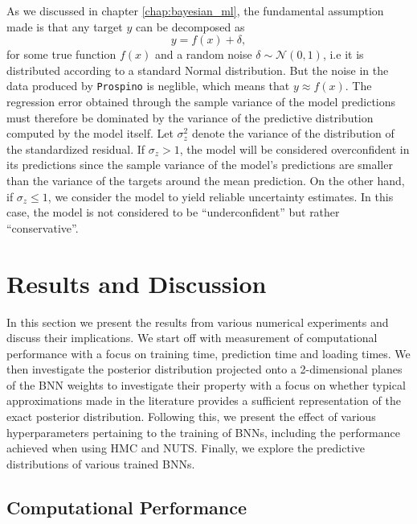 As we discussed in chapter \ref{chap:bayesian_ml}, the fundamental assumption made is that any target $y$ can be decomposed as
\begin{equation}
    y = f(x) + \delta,
\end{equation}
for some true function $f(x)$ and a random noise $\delta \sim \mathcal{N}(0, 1)$, i.e it is distributed according to a standard Normal distribution. But the noise in the data produced by \texttt{Prospino} is neglible, which means that $y \approx f(x)$. The regression error obtained through the sample variance of the model predictions must therefore be dominated by the variance of the predictive distribution computed by the model itself. Let $\sigma_z^2$ denote the variance of the distribution of the standardized residual. If $\sigma_z > 1$, the model will be considered overconfident in its predictions since the sample variance of the model's predictions are smaller than the variance of the targets around the mean prediction. On the other hand, if $\sigma_z \leq 1$, we consider the model to yield reliable uncertainty estimates. In this case, the model is not considered to be ``underconfident'' but rather ``conservative''.



\section{Results and Discussion}\label{sec:results}
In this section we present the results from various numerical experiments and discuss their implications. We start off with measurement of computational performance with a focus on training time, prediction time and loading times. We then investigate the posterior distribution projected onto a 2-dimensional planes of the BNN weights to investigate their property with a focus on whether typical approximations made in the literature provides a sufficient representation of the exact posterior distribution. Following this, we present the effect of various hyperparameters pertaining to the training of BNNs, including the performance achieved when using HMC and NUTS. Finally, we explore the predictive distributions of various trained BNNs.

\subsection{Computational Performance}

